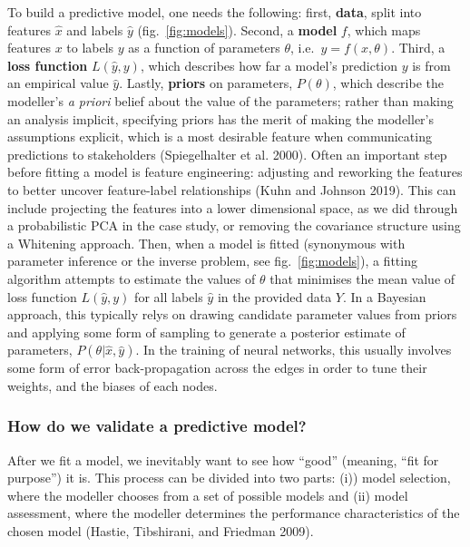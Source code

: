\documentclass[10pt,oneside]{article}
\begin{document}
To build a predictive model, one needs the following: first,
\textbf{data}, split into features \(\hat{x}\) and labels \(\hat{y}\)
(fig.~\ref{fig:models}). Second, a \textbf{model} \(f\), which maps
features \(x\) to labels \(y\) as a function of parameters \(\theta\),
i.e.~\(y = f(x, \theta)\). Third, a \textbf{loss function}
\(L(\hat{y}, y)\), which describes how far a model's prediction \(y\) is
from an empirical value \(\hat{y}\). Lastly, \textbf{priors} on
parameters, \(P(\theta)\), which describe the modeller's \emph{a priori}
belief about the value of the parameters; rather than making an analysis
implicit, specifying priors has the merit of making the modeller's
assumptions explicit, which is a most desirable feature when
communicating predictions to stakeholders (Spiegelhalter et al. 2000).
Often an important step before fitting a model is feature engineering:
adjusting and reworking the features to better uncover feature-label
relationships (Kuhn and Johnson 2019). This can include projecting the
features into a lower dimensional space, as we did through a
probabilistic PCA in the case study, or removing the covariance
structure using a Whitening approach. Then, when a model is fitted
(synonymous with parameter inference or the inverse problem, see
fig.~\ref{fig:models}), a fitting algorithm attempts to estimate the
values of \(\theta\) that minimises the mean value of loss function
\(L(\hat{y},y)\) for all labels \(\hat{y}\) in the provided data \(Y\).
In a Bayesian approach, this typically relys on drawing candidate
parameter values from priors and applying some form of sampling to
generate a posterior estimate of parameters,
\(P(\theta | \hat{x}, \hat{y})\). In the training of neural networks,
this usually involves some form of error back-propagation across the
edges in order to tune their weights, and the biases of each nodes.

\hypertarget{how-do-we-validate-a-predictive-model}{%
\subsubsection{How do we validate a predictive
model?}\label{how-do-we-validate-a-predictive-model}}

After we fit a model, we inevitably want to see how ``good'' (meaning,
``fit for purpose'') it is. This process can be divided into two parts:
(i)) model selection, where the modeller chooses from a set of possible
models and (ii) model assessment, where the modeller determines the
performance characteristics of the chosen model (Hastie, Tibshirani, and
Friedman 2009).
\end{document}

